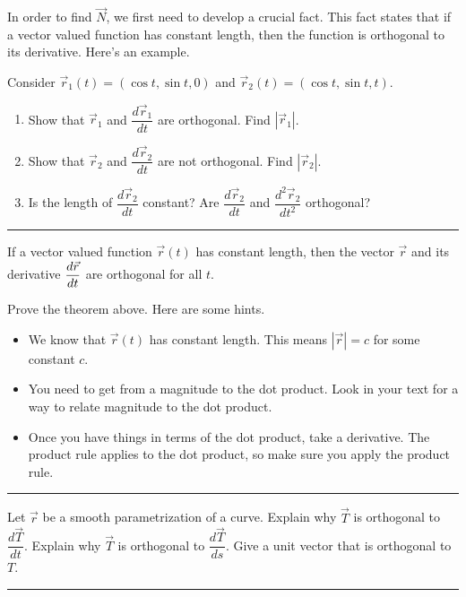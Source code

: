 In order to find $\vec N$, we first need to develop a crucial fact.  This fact states that if a vector valued function has constant length, then the function is orthogonal to its derivative. Here's an example. 

\begin{problem}
 Consider  $\vec r_1(t)=(\cos t, \sin t, 0)$ and $\vec r_2(t)=(\cos t, \sin t, t)$. 
\begin{enumerate}
 \item Show that $\vec r_1$ and $\dfrac{d\vec r_1}{dt}$ are orthogonal. Find $|\vec r_1|$.
 \item Show that $\vec r_2$ and $\dfrac{d\vec r_2}{dt}$ are not orthogonal. Find $|\vec r_2|$.
 \item Is the length of $\dfrac{d\vec r_2}{dt}$ constant? Are $\dfrac{d\vec r_2}{dt}$ and $\dfrac{d^2\vec r_2}{dt^2}$ orthogonal? 
\end{enumerate}
\hrule\end{problem}

\begin{theorem}\label{vector valued functions of constant length}
 If a vector valued function $\vec r(t)$ has constant length, then the vector $\vec r$ and its derivative $\displaystyle\frac{d\vec r}{dt}$ are orthogonal for all $t$. 
\end{theorem}

\begin{problem}
 Prove the theorem above. Here are some hints.
\begin{itemize}
 \item We know that $\vec r(t)$ has constant length. This means $|\vec r|=c$ for some constant $c$. 
 \item You need to get from a magnitude to the dot product. Look in your text for a way to relate magnitude to the dot product.
 \item Once you have things in terms of the dot product, take a derivative. The product rule applies to the dot product, so make sure you apply the product rule.
\end{itemize}
\hrule\end{problem}


\begin{problem}\label{T and N are orthogonal}
 Let $\vec r$ be a smooth parametrization of a curve.  Explain why $\vec T$ is orthogonal to $\dfrac{d\vec T}{dt}$. Explain why $\vec T$ is orthogonal to $\dfrac{d\vec T}{ds}$. Give a unit vector that is orthogonal to $T$.
\hrule\end{problem}

